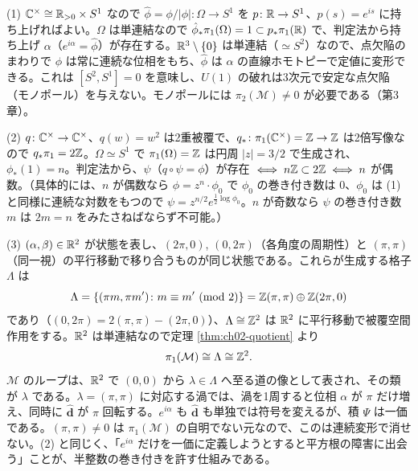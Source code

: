\begin{solution}
(1) $\mathbb{C}^\times\cong\mathbb{R}_{>0}\times S^1$ なので $\hat\phi=\phi/\lvert\phi\rvert\colon\Omega\to S^1$ を $p\colon\mathbb{R}\to S^1$、$p(s)=e^{is}$ に持ち上げればよい。$\Omega$ は単連結なので $\hat\phi_*\pi_1(\Omega)=1\subset p_*\pi_1(\mathbb{R})$ で、判定法から持ち上げ $\alpha$（$e^{i\alpha}=\hat\phi$）が存在する。$\mathbb{R}^3\setminus\{0\}$ は単連結（$\simeq S^2$）なので、点欠陥のまわりで $\phi$ は常に連続な位相をもち、$\hat\phi$ は $\alpha$ の直線ホモトピーで定値に変形できる。これは $[S^2,S^1]=0$ を意味し、$U(1)$ の破れは3次元で安定な点欠陥（モノポール）を与えない。モノポールには $\pi_2(\mathcal M)\ne0$ が必要である（第3章）。

(2) $q\colon\mathbb{C}^\times\to\mathbb{C}^\times$、$q(w)=w^2$ は2重被覆で、$q_*\colon\pi_1(\mathbb{C}^\times)=\mathbb{Z}\to\mathbb{Z}$ は2倍写像なので $q_*\pi_1=2\mathbb{Z}$。$\Omega\simeq S^1$ で $\pi_1(\Omega)=\mathbb{Z}$ は円周 $\lvert z\rvert=3/2$ で生成され、$\phi_*(1)=n$。判定法から、$\psi$（$q\circ\psi=\phi$）が存在 $\iff n\mathbb{Z}\subset2\mathbb{Z}\iff n$ が偶数。（具体的には、$n$ が偶数なら $\phi=z^{n}\cdot\phi_0$ で $\phi_0$ の巻き付き数は $0$、$\phi_0$ は (1) と同様に連続な対数をもつので $\psi=z^{n/2}e^{\frac12\log\phi_0}$。$n$ が奇数なら $\psi$ の巻き付き数 $m$ は $2m=n$ をみたさねばならず不可能。）

(3) $(\alpha,\beta)\in\mathbb{R}^2$ が状態を表し、$(2\pi,0)$, $(0,2\pi)$（各角度の周期性）と $(\pi,\pi)$（同一視）の平行移動で移り合うものが同じ状態である。これらが生成する格子 $\Lambda$ は
\[
\Lambda=\{(\pi m,\pi m')\colon m\equiv m'\ (\mathrm{mod}\ 2)\}=\mathbb{Z}(\pi,\pi)\oplus\mathbb{Z}(2\pi,0)
\]
であり（$(0,2\pi)=2(\pi,\pi)-(2\pi,0)$）、$\Lambda\cong\mathbb{Z}^2$ は $\mathbb{R}^2$ に平行移動で被覆空間作用をする。$\mathbb{R}^2$ は単連結なので定理 \ref{thm:ch02-quotient} より
\[
\pi_1(\mathcal M)\cong\Lambda\cong\mathbb{Z}^2 .
\]
$\mathcal M$ のループは、$\mathbb{R}^2$ で $(0,0)$ から $\lambda\in\Lambda$ へ至る道の像として表され、その類が $\lambda$ である。$\lambda=(\pi,\pi)$ に対応する渦では、渦を1周すると位相 $\alpha$ が $\pi$ だけ増え、同時に $\hat{\bm d}$ が $\pi$ 回転する。$e^{i\alpha}$ も $\hat{\bm d}$ も単独では符号を変えるが、積 $\Psi$ は一価である。$(\pi,\pi)\ne0$ は $\pi_1(\mathcal M)$ の自明でない元なので、このは連続変形で消せない。(2) と同じく、「$e^{i\alpha}$ だけを一価に定義しようとすると平方根の障害に出会う」ことが、半整数の巻き付きを許す仕組みである。
\end{solution}

